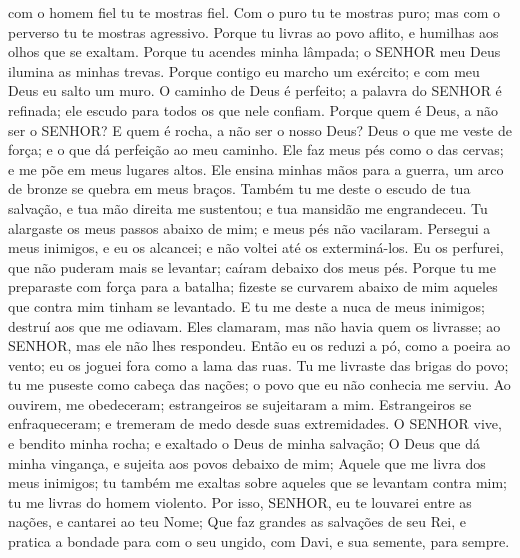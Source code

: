 {{} com o homem fiel tu te mostras fiel.
  Com o puro tu te mostras puro; mas com o perverso tu te mostras agressivo.
  Porque tu livras ao povo aflito, e humilhas aos olhos que se exaltam.
  Porque tu acendes minha lâmpada; o SENHOR meu Deus ilumina as minhas trevas.
  Porque contigo eu marcho
{} um exército; e com meu Deus eu salto um muro.
  O caminho de Deus é perfeito; a palavra do SENHOR é refinada; ele
{} escudo para todos os que nele confiam.
  Porque quem é Deus, a não ser o SENHOR? E quem é rocha, a não ser o nosso Deus?
  Deus
{} o que me veste de força; e o que dá perfeição ao meu caminho.
  Ele faz meus pés como o das cervas; e me põe em meus lugares altos.
  Ele ensina minhas mãos para a guerra,
{} um arco de bronze se quebra em meus braços.
  Também tu me deste o escudo de tua salvação, e tua mão direita me sustentou; e tua mansidão me engrandeceu.
  Tu alargaste os meus passos abaixo de mim; e meus pés não vacilaram.
  Persegui a meus inimigos, e eu os alcancei; e não voltei até os exterminá-los.
  Eu os perfurei, que não puderam mais se levantar; caíram debaixo dos meus pés.
  Porque tu me preparaste com força para a batalha; fizeste se curvarem abaixo de mim aqueles que contra mim tinham se levantado.
  E tu me deste a nuca de meus inimigos; destruí aos que me odiavam.
  Eles clamaram, mas não havia quem os livrasse;
{} ao SENHOR, mas ele não lhes respondeu.
  Então eu os reduzi a pó, como a poeira ao vento; eu os joguei fora como a lama das ruas.
  Tu me livraste das brigas do povo; tu me puseste como cabeça das nações; o povo que eu não conhecia me serviu.
  Ao
{} ouvirem,
{} me obedeceram; estrangeiros se sujeitaram a mim.
  Estrangeiros se enfraqueceram; e tremeram de medo desde suas extremidades.
  O SENHOR vive, e bendito
{} minha rocha; e exaltado
{} o Deus de minha salvação;
  O Deus que dá minha vingança, e sujeita aos povos debaixo de mim;
  Aquele que me livra dos meus inimigos; tu também me exaltas sobre aqueles que se levantam contra mim; tu me livras do homem violento.
  Por isso, SENHOR, eu te louvarei entre as nações, e cantarei ao teu Nome;
  Que faz grandes as salvações de seu Rei, e pratica a bondade para com o seu ungido, com Davi, e sua semente, para sempre.
\par }

